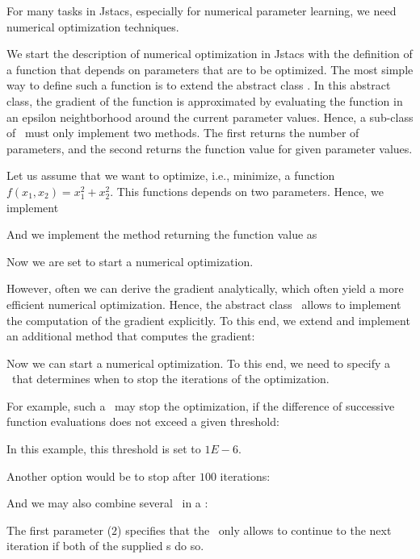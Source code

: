 \setcounter{off}{478}

For many tasks in Jstacs, especially for numerical parameter learning, we need numerical optimization techniques.

We start the description of numerical optimization in Jstacs with the definition of a function that depends on parameters that are to be optimized. The most simple way to define such a function is to extend the abstract class \NumericalDifferentiableFunction. In this abstract class, the gradient of the function is approximated by evaluating the function in an epsilon neightborhood around the current parameter values. Hence, a sub-class of \NumericalDifferentiableFunction~must only implement two methods. The first returns the number of parameters, and the second returns the function value for given parameter values.

Let us assume that we want to optimize, i.e., minimize, a function $f(x_1,x_2)=x_1^2 + x_2^2$. This functions depends on two parameters. Hence, we implement
\addtocounter{off}{6}
And we implement the method returning the function value as
\addtocounter{off}{5}
Now we are set to start a numerical optimization.

However, often we can derive the gradient analytically, which often yield a more efficient numerical optimization. Hence, the abstract class \DifferentiableFunction~allows to implement the computation of the gradient explicitly. To this end, we extend \DifferentiableFunction and implement an additional method that computes the gradient:
\addtocounter{off}{19}

Now we can start a numerical optimization. To this end, we need to specify a \TerminationCondition~that determines when to stop the iterations of the optimization.

For example, such a \TerminationCondition~may stop the optimization, if the difference of successive function evaluations does not exceed a given threshold:
\addtocounter{off}{7}
In this example, this threshold is set to $1E-6$.

Another option would be to stop after $100$ iterations:
\addtocounter{off}{1}

And we may also combine several \TerminationCondition~in a \CombinedCondition:
\addtocounter{off}{3}
The first parameter ($2$) specifies that the \CombinedCondition~only allows to continue to the next iteration if both of the supplied \TerminationCondition s do so. 

